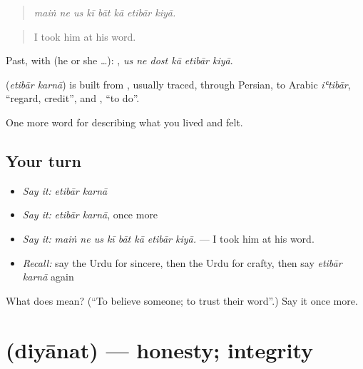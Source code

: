 \begin{quote}
       
\end{quote}

\begin{quote}
\emph{maiṅ ne us kī bāt kā etibār kiyā.}
\end{quote}

\begin{quote}
I took him at his word.
\end{quote}

Past, with  (he or she …):      , \emph{us ne dost kā etibār kiyā}.

\begin{cousinweb}
\textbf{ } (\emph{etibār karnā}) is built from \textbf{}, usually traced, through Persian, to Arabic \emph{iʿtibār}, \textquotedblleft{}regard, credit\textquotedblright{}, and \textbf{}, \textquotedblleft{}to do\textquotedblright{}.
\end{cousinweb}

\begin{grammarlens}[title={What you've built}]
One more word for describing what you lived and felt.
\end{grammarlens}

\subsection*{Your turn}
\begin{itemize}
\raggedright
  \item \emph{Say it:} \emph{etibār karnā}
  \item \emph{Say it:} \emph{etibār karnā}, once more
  \item \emph{Say it:} \emph{maiṅ ne us kī bāt kā etibār kiyā.} — I took him at his word.
  \item \emph{Recall:} say the Urdu for sincere, then the Urdu for crafty, then say \emph{etibār karnā} again
\end{itemize}

\begin{tcolorbox}[breakable,colback=teal!4,colframe=teal!35!black,title={Before you move on}]
What does   mean? (\textquotedblleft{}To believe someone; to trust their word\textquotedblright{}.) Say it once more.
\end{tcolorbox}
\section[\texorpdfstring{\ur{دیانت} (diyānat)}{دیانت (diyānat)}]{ (diyānat) — honesty; integrity}

